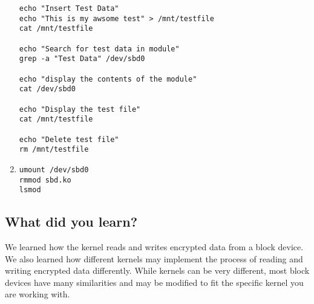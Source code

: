 \documentclass[draftclsnofoot, onecolumn, compsoc, 10pt]{IEEEtran}
\begin{document}
\begin{enumerate}
\begin{lstlisting}
echo "Insert Test Data"
echo "This is my awsome test" > /mnt/testfile
cat /mnt/testfile

echo "Search for test data in module"
grep -a "Test Data" /dev/sbd0

echo "display the contents of the module"
cat /dev/sbd0

echo "Display the test file"
cat /mnt/testfile

echo "Delete test file"
rm /mnt/testfile
\end{lstlisting}

\item
\begin{lstlisting}
umount /dev/sbd0
rmmod sbd.ko
lsmod
\end{lstlisting}

        \end{enumerate}
    \subsection{What did you learn?}
    We learned how the kernel reads and writes encrypted data from a block device. We also learned how different kernels may implement the process of reading and writing encrypted data differently. While kernels can be very different, most block devices have many similarities and may be modified to fit the specific kernel you are working with.
\end{document}
